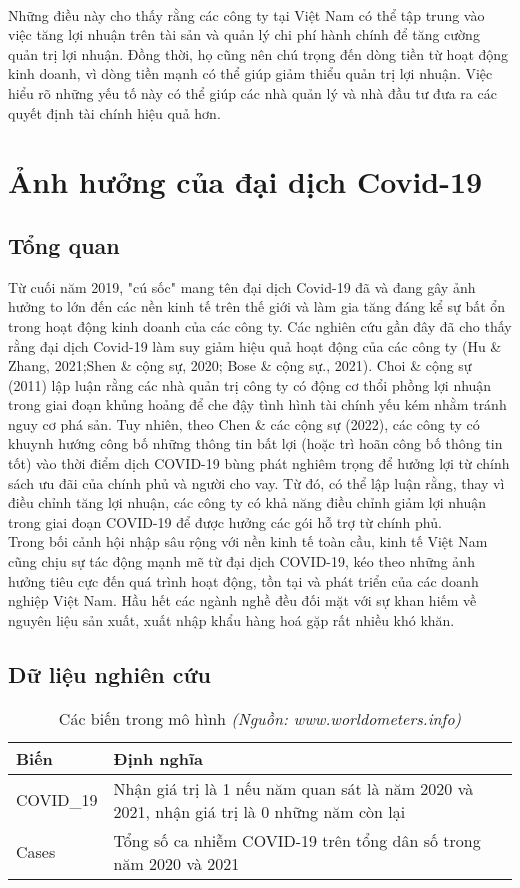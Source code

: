 \documentclass[a4paper]{article}
\begin{document}
\\ \indent Những điều này cho thấy rằng các công ty tại Việt Nam có thể tập trung vào việc tăng lợi nhuận trên tài sản và quản lý chi phí hành chính để tăng cường quản trị lợi nhuận. Đồng thời, họ cũng nên chú trọng đến dòng tiền từ hoạt động kinh doanh, vì dòng tiền mạnh có thể giúp giảm thiểu quản trị lợi nhuận. Việc hiểu rõ những yếu tố này có thể giúp các nhà quản lý và nhà đầu tư đưa ra các quyết định tài chính hiệu quả hơn.

\section{Ảnh hưởng của đại dịch Covid-19}
\subsection{Tổng quan}
Từ cuối năm 2019, "cú sốc" mang tên đại dịch Covid-19 đã và đang gây ảnh hưởng to lớn đến các nền kinh tế trên thế giới và làm gia tăng đáng kể sự bất ổn trong hoạt động kinh doanh của các công ty. Các nghiên cứu gần đây đã cho thấy rằng đại dịch Covid-19 làm suy giảm hiệu quả hoạt động của các công ty (Hu \& Zhang, 2021;Shen \& cộng sự, 2020; Bose \& cộng sự., 2021). Choi \& cộng sự (2011) lập luận rằng các nhà quản trị công ty có động cơ thổi phồng lợi nhuận trong giai đoạn khủng hoảng để che đậy tình hình tài chính yếu kém nhằm tránh nguy cơ phá sản. Tuy nhiên, theo Chen \& các cộng sự (2022), các công ty có khuynh hướng công bố những thông tin bất lợi (hoặc trì hoãn công bố thông tin tốt) vào thời điểm dịch  COVID-19 bùng  phát nghiêm trọng để hưởng lợi từ chính sách ưu đãi của chính phủ và người cho vay. Từ đó, có thể lập luận rằng, thay vì điều chỉnh tăng lợi nhuận, các công ty có khả năng điều chỉnh giảm lợi nhuận trong giai đoạn COVID-19 để được hưởng các gói hỗ trợ từ chính phủ.\\
\indent Trong bối cảnh hội nhập sâu rộng với nền kinh tế toàn cầu, kinh tế Việt Nam cũng chịu sự tác động mạnh mẽ từ đại dịch COVID-19, kéo theo những ảnh hưởng tiêu cực đến quá trình hoạt động, tồn tại và phát triển của các doanh nghiệp Việt Nam. Hầu hết các ngành nghề đều đối mặt với sự khan hiếm về nguyên liệu sản xuất, xuất nhập khẩu hàng hoá gặp rất nhiều khó khăn.
\subsection{Dữ liệu nghiên cứu}
\begin{table}[h!]
\centering
\caption{Các biến trong mô hình \textit{(Nguồn: www.worldometers.info)}}
\label{tb5}
\begin{tabular}{lp{9cm}p{1cm}}
\toprule
Biến & Định nghĩa\\
\midrule
COVID\_19 & Nhận giá trị là 1 nếu năm quan sát là năm 2020 và 2021, nhận giá trị là 0 những năm còn lại \\
Cases & Tổng số ca nhiễm COVID-19 trên tổng dân số trong năm 2020 và 2021 \\
\bottomrule
\end{tabular}
\end{table}
\end{document}
